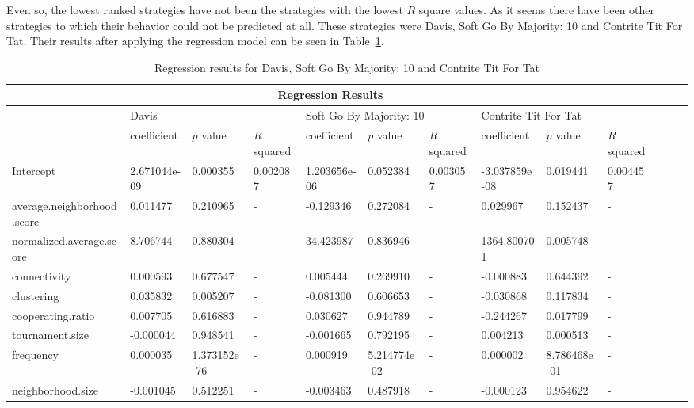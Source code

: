 Even so, the lowest ranked strategies have not been the strategies with the lowest
\(R\) square values. As it seems there have been other strategies to which their behavior
could not be predicted at all. These strategies were Davis, Soft Go By Majority: 10
and Contrite Tit For Tat. Their results after applying the regression model
can be seen in Table~\ref{reg-for-r-bot}.

\begin{table}[!hbtp]
	\centering
	\begin{adjustbox}{width=1\textwidth, height=0.2\textwidth}
		\small
		\begin{tabular}{|l|l|l|l|l|l|l|l|l|l|l|l|l|}
			\toprule
			\multicolumn{10}{|c|}{\textbf{Regression Results}}                                                                       \\ \hline
			& \multicolumn{3}{l|}{Davis} & \multicolumn{3}{l|}{Soft Go By Majority: 10} & \multicolumn{3}{l|}{Contrite Tit For Tat}\\ \hline
			  & coefficient & \(p\) value & \(R\) squared & coefficient & \(p\) value & \(R\) squared & coefficient & \(p\) value & \(R\) squared \\ \hline
			Intercept 								 &2.671044e-09  & 0.000355			& 0.002087	& 1.203656e-06	& 0.052384	& 0.003057	& -3.037859e-08 & 0.019441		 & 0.004457	\\ \hline
			average.neighborhood.score & 0.011477			& 0.210965			&	-					& -0.129346			& 0.272084 	& -					& 0.029967  		& 0.152437			& -         \\ \hline
			normalized.average.score	 & 8.706744			& 0.880304 			&	-					& 34.423987			& 0.836946 	& -					& 1364.800701 	& 0.005748			& -         \\ \hline
			connectivity							 & 0.000593			& 0.677547			&	-					& 0.005444			& 0.269910 	& -					& -0.000883			& 0.644392			& -         \\ \hline
			clustering  							 & 0.035832			& 0.005207			&	-					& -0.081300			& 0.606653	& -					& -0.030868 		& 0.117834			& -         \\ \hline
			cooperating.ratio					 & 0.007705			& 0.616883			&	-					& 0.030627 			& 0.944789 	& -					& -0.244267			& 0.017799			& -         \\ \hline
			tournament.size						 &-0.000044			& 0.948541			&	-					& -0.001665 		& 0.792195 	& -					& 0.004213 			& 0.000513			& -         \\ \hline
			frequency									 &0.000035			& 1.373152e-76	&	-					& 0.000919			& 5.214774e-02	& -			&  0.000002			& 8.786468e-01	& -         \\ \hline
			neighborhood.size			     &-0.001045			& 0.512251 			&	-					& -0.003463			& 0.487918			& -			& -0.000123 		& 0.954622	& -         		\\ \bottomrule
		\end{tabular}
	\end{adjustbox}
	\caption{Regression results for Davis, Soft Go By Majority: 10 and Contrite Tit For Tat}
	\label{reg-for-r-bot}
\end{table}

